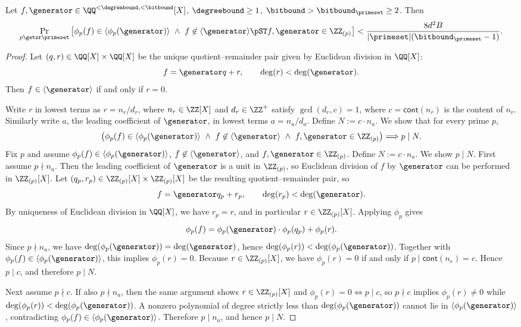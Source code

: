 \begin{lemma}
\label{lemma:app-phi-collision}
Let $f,\generator \in \QQ^{<\degreebound,<\bitbound}[X]$, $\degreebound \ge 1$, $\bitbound > \bitbound_\primeset \ge 2$.
Then
\[
\Pr_{p \getsr \primeset}\left[\phi_p(f) \in \langle \phi_p(\generator) \rangle \ \wedge\ f \not\in \langle \generator \rangle \pST f,\generator \in \ZZ_{(p)}\right]
< \frac{8 d^2 B}{|\primeset|(\bitbound_\primeset-1)}.
\]
\end{lemma}
\begin{proof}
Let $(q,r) \in \QQ[X]\times \QQ[X]$ be the unique quotient--remainder pair given by Euclidean division in $\QQ[X]$:
\[
f = \generator q + r,
\qquad
\deg(r) < \deg(\generator).
\]
Then $f \in \langle \generator\rangle$ if and only if $r=0$.

Write $r$ in lowest terms as $r=n_r/d_r$, where $n_r\in \ZZ[X]$ and $d_r\in \ZZ^{+}$ satisfy $\gcd(d_r,c)=1$, where $c = \mathsf{cont}(n_r)$ is the content of $n_r$. Similarly write $a$, the leading coefficient of $\generator$, in lowest terms $a = n_a/d_a$. Define $N := c \cdot n_a$. We show that for every prime $p$,
\[
\left(\phi_p(f) \in \langle \phi_p(\generator) \rangle \ \wedge\ f \not\in \langle \generator \rangle \ \wedge\ f,\generator \in \ZZ_{(p)}\right)
\Longrightarrow p \mid N.
\]
Fix $p$ and assume $\phi_p(f) \in \langle \phi_p(\generator) \rangle$, $f \not\in \langle \generator \rangle$, and $f,\generator \in \ZZ_{(p)}$.
Define $N := c \cdot n_a$. We show $p \mid N$. First assume $p \nmid n_a$. Then the leading coefficient of $\generator$ is a unit in $\ZZ_{(p)}$, so Euclidean division of $f$ by $\generator$ can be performed in $\ZZ_{(p)}[X]$. Let $(q_p,r_p)\in \ZZ_{(p)}[X]\times \ZZ_{(p)}[X]$ be the resulting quotient--remainder pair, so
\[
f = \generator q_p + r_p,
\qquad
\deg(r_p) < \deg(\generator).
\]
By uniqueness of Euclidean division in $\QQ[X]$, we have $r_p=r$, and in particular $r\in \ZZ_{(p)}[X]$. Applying $\phi_p$ gives
\[
\phi_p(f) = \phi_p(\generator)\cdot \phi_p(q_p) + \phi_p(r).
\]
Since $p \nmid n_a$, we have $\deg(\phi_p(\generator))=\deg(\generator)$, hence $\deg(\phi_p(r))<\deg(\phi_p(\generator))$.  Together with $\phi_p(f)\in \langle \phi_p(\generator)\rangle$, this implies $\phi_p(r)=0$. Because $r\in \ZZ_{(p)}[X]$, we have $\phi_p(r)=0$ if and only if $p \mid \mathsf{cont}(n_r)=c$. Hence $p \mid c$, and therefore $p \mid N$.

Next assume $p \nmid c$. If also $p \nmid n_a$, then the same argument shows $r\in \ZZ_{(p)}[X]$ and $\phi_p(r)=0 \Longleftrightarrow p \mid c$, so $p \nmid c$ implies $\phi_p(r)\neq 0$ while $\deg(\phi_p(r))<\deg(\phi_p(\generator))$. A nonzero polynomial of degree strictly less than $\deg(\phi_p(\generator))$ cannot lie in $\langle \phi_p(\generator)\rangle$, contradicting $\phi_p(f)\in \langle \phi_p(\generator)\rangle$.  Therefore $p \mid n_a$, and hence $p \mid N$.


\end{proof}
